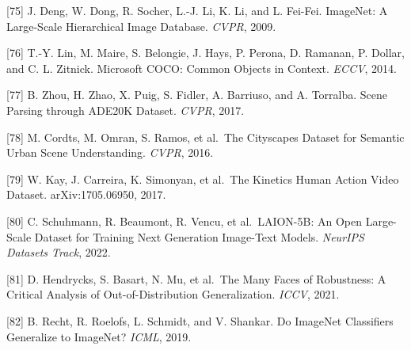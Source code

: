 {[}75{]} J. Deng, W. Dong, R. Socher, L.-J. Li, K. Li, and L. Fei-Fei. ImageNet: A Large-Scale Hierarchical Image Database. \emph{CVPR}, 2009.

{[}76{]} T.-Y. Lin, M. Maire, S. Belongie, J. Hays, P. Perona, D. Ramanan, P. Dollar, and C. L. Zitnick. Microsoft COCO: Common Objects in Context. \emph{ECCV}, 2014.

{[}77{]} B. Zhou, H. Zhao, X. Puig, S. Fidler, A. Barriuso, and A. Torralba. Scene Parsing through ADE20K Dataset. \emph{CVPR}, 2017.

{[}78{]} M. Cordts, M. Omran, S. Ramos, et al.~The Cityscapes Dataset for Semantic Urban Scene Understanding. \emph{CVPR}, 2016.

{[}79{]} W. Kay, J. Carreira, K. Simonyan, et al.~The Kinetics Human Action Video Dataset. arXiv:1705.06950, 2017.

{[}80{]} C. Schuhmann, R. Beaumont, R. Vencu, et al.~LAION-5B: An Open Large-Scale Dataset for Training Next Generation Image-Text Models. \emph{NeurIPS Datasets Track}, 2022.

{[}81{]} D. Hendrycks, S. Basart, N. Mu, et al.~The Many Faces of Robustness: A Critical Analysis of Out-of-Distribution Generalization. \emph{ICCV}, 2021.

{[}82{]} B. Recht, R. Roelofs, L. Schmidt, and V. Shankar. Do ImageNet Classifiers Generalize to ImageNet? \emph{ICML}, 2019.

